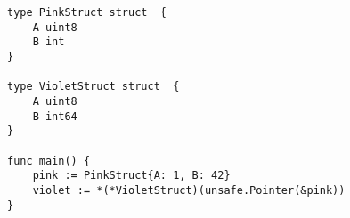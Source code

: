 \begin{lstlisting}[language=Golang, label=lst:architecture-dependent-types-cast, caption=Incorrect cast between architecture-dependent types]
type PinkStruct struct  {
    A uint8
    B int
}

type VioletStruct struct  {
    A uint8
    B int64
}

func main() {
    pink := PinkStruct{A: 1, B: 42}
    violet := *(*VioletStruct)(unsafe.Pointer(&pink))
}
\end{lstlisting}